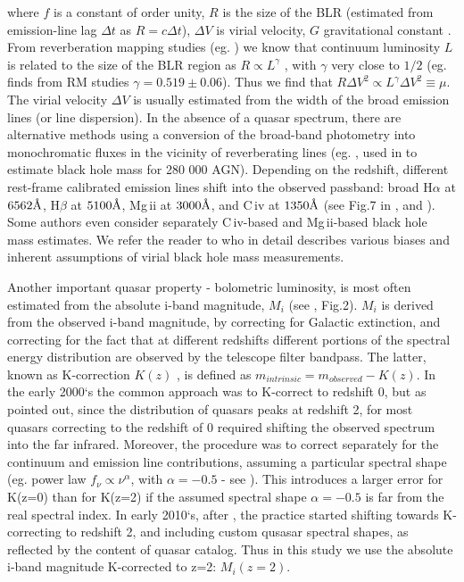 \documentclass[twocolumn]{aastex62}
\let\oldAA\AA
\renewcommand{\AA}{\text{\normalfont\oldAA}}
\begin{document}
where $f$ is a constant of order unity, $R$ is the size of the BLR (estimated from  emission-line lag $\Delta t$ as $R = c \Delta t$), $\Delta V$ is virial velocity, $G$ gravitational constant \citep{shen2008}.  From reverberation mapping studies (eg. \citealt{shen2018}) we know that continuum luminosity $L$ is related to the size of the BLR region as $R \propto L^{\gamma}$ \citep{vestergaard2006}, with $\gamma$ very close to $1/2$ (eg. \citealt{bentz2009} finds from RM studies $\gamma = 0.519 \pm 0.06$). Thus we find  that $R \Delta V^{2} \propto L^{\gamma} \Delta V^{2} \equiv \mu$. The virial velocity $\Delta V$ is usually estimated from the width of the broad emission lines (or line dispersion).  In the absence of a quasar spectrum, there are alternative methods using a conversion of the broad-band photometry into monochromatic fluxes in the vicinity of reverberating lines (eg. \citealt{kozlowski2015}, used in \citealt{kozlowski2017b} to estimate black hole mass for 280 000 AGN).   
Depending on the redshift, different rest-frame calibrated emission lines shift into the observed passband: broad H$\alpha$ at  $6562\mbox{\AA}$, H$\beta$ at  $5100 \mbox{\AA}$, Mg\,{\sc ii} at $3000\mbox{\AA}$, and C\,{\sc iv} at $1350\mbox{\AA}$ (see Fig.7 in \citealt{shen2018}, and \citealt{vestergaard2002}). Some authors even consider separately C\,{\sc iv}-based and  Mg\,{\sc ii}-based  black hole mass estimates. We refer the reader to \citet{shen2008} who in detail describes various biases and inherent assumptions of virial black hole mass measurements. 



Another important quasar property - bolometric luminosity, is most often estimated from the absolute i-band magnitude, $M_{i}$ (see \citealt{shen2008}, Fig.2). $M_{i}$ is derived from the observed i-band magnitude, by correcting for Galactic extinction, and correcting for the fact that at different redshifts different portions of the spectral energy distribution are observed by the telescope filter bandpass. The latter, known as K-correction $K(z)$ \citep{oke1968},  is defined as $m_{intrinsic} = m_{observed} - K(z)$. In the early 2000`s the common approach was to K-correct to redshift 0, but as \citep{richards2006a} pointed out, since the distribution of quasars peaks at redshift 2, for most quasars correcting to the redshift of 0 required shifting the observed spectrum into the far infrared. Moreover, the procedure was to correct separately for the continuum and emission line contributions, assuming a particular spectral shape (eg. power law  $f_{\nu} \propto \nu^{\alpha}$, with $\alpha=-0.5$ - see \citealt{schneider2010, vandenberk2001, richards2006a}).  This introduces a larger error for K(z=0) than for K(z=2) if the assumed spectral shape $\alpha=-0.5$ is far from the real spectral index. In early 2010`s, after  \citealt{richards2006a, wisotzki2000, blanton2003},  the practice started shifting towards K-correcting to redshift 2,  and including custom qusasar spectral shapes, as reflected by the content of \cite{shen2011} quasar catalog. Thus in this study we use  the absolute i-band magnitude K-corrected to z=2: $M_{i}(z=2)$. %
\end{document}
